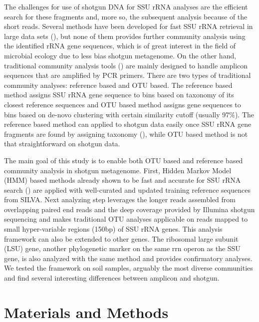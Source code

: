 \documentclass[12pt]{article}
\begin{document}
  The challenges for use of shotgun DNA for SSU rRNA analyses are the efficient search for these fragments and, more so, the subsequent analysis because of the short reads. Several methods have been developed for fast SSU rRNA retrieval in large data sets (\cite{ribopicker,metarna,rrnaselector,metaxa}), but none of them provides further community analysis using the identified rRNA gene sequences, which is of great interest in the field of microbial ecology due to less bias shotgun metagenome. On the other hand, traditional community analysis tools (\cite{rdp2009,mothur,qiime}) are mainly designed to handle amplicon sequences that are amplified by PCR primers. There are two types of traditional community analyses: reference based and OTU based. The reference based method assigns SSU rRNA gene sequence to bins based on taxonomy of its closest reference sequences and OTU based method assigns gene sequences to bins based on de-novo clustering with certain similarity cutoff (usually 97\%). The reference based method can applied to shotgun data easily once SSU rRNA gene fragments are found by assigning taxonomy (\cite{rdpclassifier}), while OTU based method is not that straightforward on shotgun data.

  The main goal of this study is to enable both OTU based and reference based community analysis in shotgun metagenome. First, Hidden Markov Model (HMM) based methods already shown to be fast and accurate for SSU rRNA search (\cite{metarna,rrnaselector,metaxa}) are applied with well-curated and updated training reference sequences from SILVA. Next analyzing step leverages the longer reads assembled from overlapping paired end reads and the deep coverage provided by Illumina shotgun sequencing and makes traditional OTU analyses applicable on reads mapped to small hyper-variable regions (150bp) of SSU rRNA genes. This analysis framework can also be extended to other genes. The ribosomal large subunit (LSU) gene, another phylogenetic marker on the same rrn operon as the SSU gene, is also analyzed with the same method and provides confirmatory analyses. We tested the framework on soil samples, arguably the most diverse communities and find several interesting differences between amplicon and shotgun.

\section{Materials and Methods}
\end{document}
